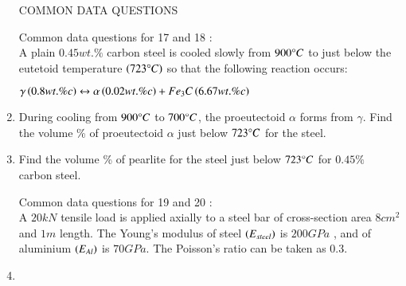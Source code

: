 \documentclass[journal]{IEEEtran}
\begin{document}
\begin{enumerate}[start=10]
\begin{enumerate}
\end{enumerate}
\begin{center}
 COMMON DATA QUESTIONS
\end{center}
Common data questions for 17 and 18 :\\
A plain $0.45 wt.\% $ carbon steel is cooled slowly from $900 \degree C$ to just below the eutetoid temperature $\left(723 \degree C\right)$ so that the following reaction occurs: 
\begin{center}
    $\gamma \left(0.8 wt.\% c\right) \leftrightarrow \alpha \left(0.02 wt.\% c\right) + Fe_3C\left(6.67 wt.\% c\right)$
\end{center}
\item %
During cooling from $900 \degree C$ to $700 \degree C$, the proeutectoid $\alpha$ forms from $\gamma$. Find the volume \% of proeutectoid $\alpha $ just below $723 \degree C$ for the steel.
\begin{enumerate}
\end{enumerate}
\item %
Find the volume \% of pearlite for the steel just below $723 \degree C$ for $0.45 \%$ carbon steel.
\begin{enumerate}
\end{enumerate}
Common data questions for 19 and 20 :\\
A $20kN$ tensile load is applied axially to a steel bar of cross-section area $8 cm^2$ and $1m$ length. The Young's modulus of steel $\left(E_{steel}\right)$ is $200GPa$ , and of aluminium $\left(E_{Al}\right)$ is $70 GPa$. The Poisson's ratio  can be taken as 0.3.
\item %

\end{enumerate}
\end{document}

